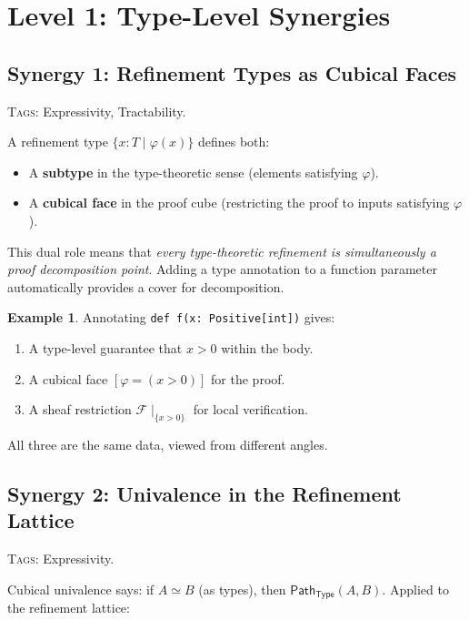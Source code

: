 \documentclass[11pt,a4paper]{article}
\theoremstyle{definition}
\newtheorem{example}[definition]{Example}
\theoremstyle{plain}
\newcommand{\Path}{\mathsf{Path}}
\newcommand{\Type}{\mathsf{Type}}
\newcommand{\presheaf}{\mathcal{F}}
\newcommand{\restr}[2]{#1\!\!\mid_{#2}}
\begin{document}
\section{Level 1: Type-Level Synergies}
\label{sec:syn-types}


\subsection{Synergy 1: Refinement Types as Cubical Faces}
\label{sec:syn-ref-face}

\textsc{Tags:} Expressivity, Tractability.

\medskip\noindent
A refinement type $\{x : T \mid \varphi(x)\}$ defines both:
\begin{itemize}
\item A \textbf{subtype} in the type-theoretic sense (elements
  satisfying $\varphi$).
\item A \textbf{cubical face} in the proof cube (restricting the
  proof to inputs satisfying $\varphi$).
\end{itemize}

This dual role means that \emph{every type-theoretic refinement
is simultaneously a proof decomposition point}.  Adding a type
annotation to a function parameter automatically provides a
cover for decomposition.

\begin{example}
Annotating \texttt{def f(x: Positive[int])} gives:
\begin{enumerate}
\item A type-level guarantee that $x > 0$ within the body.
\item A cubical face $[\varphi = (x > 0)]$ for the proof.
\item A sheaf restriction $\restr{\presheaf}{\{x > 0\}}$ for local
  verification.
\end{enumerate}
All three are the same data, viewed from different angles.
\end{example}


\subsection{Synergy 2: Univalence in the Refinement Lattice}
\label{sec:syn-ua-ref}

\textsc{Tags:} Expressivity.

\medskip\noindent
Cubical univalence says: if $A \simeq B$ (as types), then
$\Path_\Type(A, B)$.  Applied to the refinement lattice:
\end{document}

